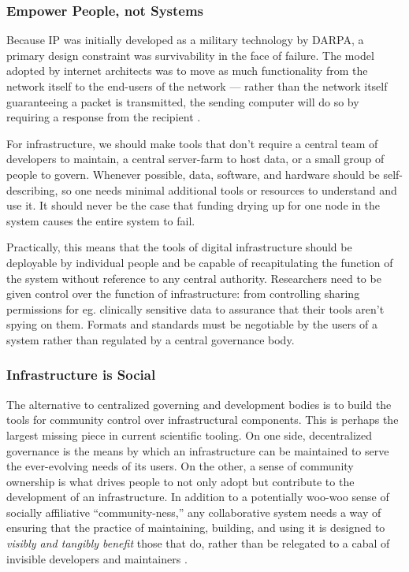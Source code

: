 \documentclass[10pt]{article}
\begin{document}
\begin{multicols}{2}
\hypertarget{empower-people-not-systems}{%
\subsubsection{Empower People, not
Systems}\label{empower-people-not-systems}}

Because IP was initially developed as a military technology by DARPA, a
primary design constraint was survivability in the face of failure. The
model adopted by internet architects was to move as much functionality
from the network itself to the end-users of the network --- rather than
the network itself guaranteeing a packet is transmitted, the sending
computer will do so by requiring a response from the recipient \cite{clarkDesignPhilosophyDARPA1988} .

For infrastructure, we should make tools that don't require a central
team of developers to maintain, a central server-farm to host data, or a
small group of people to govern. Whenever possible, data, software, and
hardware should be self-describing, so one needs minimal additional
tools or resources to understand and use it. It should never be the case
that funding drying up for one node in the system causes the entire
system to fail.

Practically, this means that the tools of digital infrastructure should
be deployable by individual people and be capable of recapitulating the
function of the system without reference to any central authority.
Researchers need to be given control over the function of
infrastructure: from controlling sharing permissions for eg. clinically
sensitive data to assurance that their tools aren't spying on them.
Formats and standards must be negotiable by the users of a system rather
than regulated by a central governance body.

\hypertarget{infrastructure-is-social}{%
\subsubsection{Infrastructure is
Social}\label{infrastructure-is-social}}

The alternative to centralized governing and development bodies is to
build the tools for community control over infrastructural components.
This is perhaps the largest missing piece in current scientific tooling.
On one side, decentralized governance is the means by which an
infrastructure can be maintained to serve the ever-evolving needs of its
users. On the other, a sense of community ownership is what drives
people to not only adopt but contribute to the development of an
infrastructure. In addition to a potentially woo-woo sense of socially
affiliative ``community-ness,'' any collaborative system needs a way of
ensuring that the practice of maintaining, building, and using it is
designed to \emph{visibly and tangibly benefit} those that do, rather
than be relegated to a cabal of invisible developers and maintainers
\cite{grudinGroupwareSocialDynamics1994, randallDistributedOntologyBuilding2011} .


\end{multicols}
\end{document}
